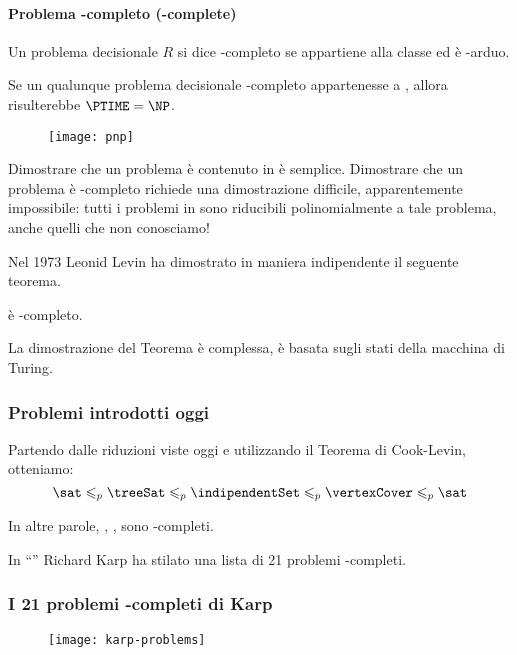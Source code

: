 \paragraph{Problema {\NP}-completo ({\NP}-complete)}
Un problema decisionale \(R\) si dice {\NP}-completo se appartiene alla classe {\NP} ed è {\NP}-arduo.

\begin{note}
Se un qualunque problema decisionale {\NP}-completo appartenesse a {\PTIME}, allora risulterebbe \(\PTIME = \NP\).
\end{note}

\begin{figure}[H]\centering
    \texttt{[image: pnp]}
\end{figure}

Dimostrare che un problema è contenuto in {\NP} è semplice.
Dimostrare che un problema è {\NP}-completo richiede una dimostrazione difficile, apparentemente impossibile: tutti i problemi in {\NP} sono riducibili polinomialmente a tale problema, anche quelli che non conosciamo!

Nel 1973 Leonid Levin ha dimostrato in maniera indipendente il seguente teorema.
\begin{theorem}
{\sat} è {\NP}-completo.
\end{theorem}
La dimostrazione del Teorema è complessa, è basata sugli stati della macchina di Turing.

\subsubsection*{Problemi introdotti oggi}

Partendo dalle riduzioni viste oggi e utilizzando il Teorema di Cook-Levin, otteniamo:
\[
    {\sat} \leqslant_p {\treeSat} \leqslant_p {\indipendentSet} \leqslant_p {\vertexCover} \leqslant_p {\sat}
\]

In altre parole, {\treeSat}, {\indipendentSet}, {\vertexCover} sono {\NP}-completi.

In \enquote{} Richard Karp ha stilato una lista di 21 problemi {\NP}-completi.

\subsubsection*{I 21 problemi {\NP}-completi di Karp}

\begin{figure}[H]\centering
    \texttt{[image: karp-problems]}
\end{figure}

